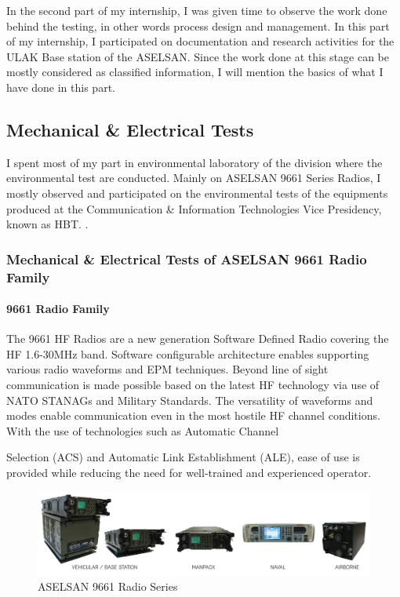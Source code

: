 	In the second part of my internship, I was given time to observe the work done behind the testing, in other words process design and management. In this part of my internship, I participated on documentation and research activities for the ULAK Base station of the ASELSAN. Since the work done at this stage can be mostly considered as classified information, I will mention the basics of what I have done in this part.
		
\subsection{Mechanical \& Electrical Tests   }

	I spent most of my part in environmental laboratory of the division where the environmental test are conducted. Mainly on ASELSAN 9661 Series Radios, I mostly observed and participated on the environmental tests of the equipments produced at the Communication \& Information Technologies Vice Presidency, known as HBT. .

\subsubsection{Mechanical \& Electrical Tests of ASELSAN 9661 Radio Family  }

\paragraph{9661 Radio Family}
\- \indent	
	The 9661 HF Radios are a new generation Software Defined Radio covering the HF 1.6-30MHz band. Software configurable architecture enables supporting various radio waveforms and EPM techniques. Beyond line of sight communication is made possible based on the latest HF technology via use of NATO STANAGs and Military Standards. The versatility of waveforms and modes enable communication even in the most hostile HF channel conditions. With the use of technologies such as Automatic Channel

	Selection (ACS) and Automatic Link Establishment (ALE), ease of use is provided while reducing the need for well-trained and experienced operator.

\begin{figure}[H]
	\center
	\setlength{\unitlength}{\textwidth} 
	\includegraphics[width=1.0\unitlength]{radio_type}
	\caption{\label{fig:radtyp}ASELSAN 9661 Radio Series }
\end{figure}

